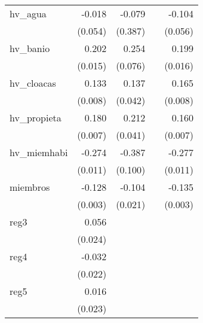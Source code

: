 {\begin{longtable}{l*{4}{D{.}{.}{-1}}}
\addlinespace
hv\_agua     &      -0.018         &      -0.079         &                     &      -0.104         \\
            &     (0.054)         &     (0.387)         &                     &     (0.056)         \\
\addlinespace
hv\_banio    &       0.202\sym{***}&       0.254\sym{***}&                     &       0.199\sym{***}\\
            &     (0.015)         &     (0.076)         &                     &     (0.016)         \\
\addlinespace
hv\_cloacas  &       0.133\sym{***}&       0.137\sym{**} &                     &       0.165\sym{***}\\
            &     (0.008)         &     (0.042)         &                     &     (0.008)         \\
\addlinespace
hv\_propieta &       0.180\sym{***}&       0.212\sym{***}&                     &       0.160\sym{***}\\
            &     (0.007)         &     (0.041)         &                     &     (0.007)         \\
\addlinespace
hv\_miemhabi &      -0.274\sym{***}&      -0.387\sym{***}&                     &      -0.277\sym{***}\\
            &     (0.011)         &     (0.100)         &                     &     (0.011)         \\
\addlinespace
miembros    &      -0.128\sym{***}&      -0.104\sym{***}&                     &      -0.135\sym{***}\\
            &     (0.003)         &     (0.021)         &                     &     (0.003)         \\
\addlinespace
reg3        &       0.056\sym{*}  &                     &                     &                     \\
            &     (0.024)         &                     &                     &                     \\
\addlinespace
reg4        &      -0.032         &                     &                     &                     \\
            &     (0.022)         &                     &                     &                     \\
\addlinespace
reg5        &       0.016         &                     &                     &                     \\
            &     (0.023)         &                     &                     &                     \\

\end{longtable}}
